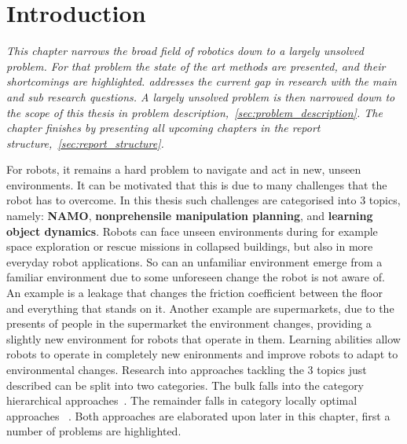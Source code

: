 \chapter{Introduction}%
\label{chap:introduction}
\textit{This chapter narrows the broad field of robotics down to a largely unsolved problem. For that problem the state of the art methods are presented, and their shortcomings are highlighted.  addresses the current gap in research with the main and sub research questions. A largely unsolved problem is then narrowed down to the scope of this thesis in problem description,~\cref{sec:problem_description}. The chapter finishes by presenting all upcoming chapters in the report structure,~\cref{sec:report_structure}.\bs}



For robots, it remains a hard problem to navigate and act in new, unseen environments. It can be motivated that this is due to many challenges that the robot has to overcome. In this thesis such challenges are categorised into 3 topics, namely: \textbf{\ac{NAMO}}, \textbf{nonprehensile manipulation planning}, and \textbf{learning object dynamics}. Robots can face unseen environments during for example space exploration or rescue missions in collapsed buildings, but also in more everyday robot applications. So can an unfamiliar environment emerge from a familiar environment due to some unforeseen change the robot is not aware of. An example is a leakage that changes the friction coefficient between the floor and everything that stands on it. Another example are supermarkets, due to the presents of people in the supermarket the environment changes, providing a slightly new environment for robots that operate in them. Learning abilities allow robots to operate in completely new enironments and improve robots to adapt to environmental changes. Research into approaches tackling the 3 topics just described can be split into two categories. The bulk falls into the category hierarchical approaches~\cite{kaelbling_hierarchical_2011,scholz_navigation_2016,krontiris_dealing_2015}. The remainder falls in category locally optimal approaches ~\cite{vega-brown_asymptotically_2020,sabbaghnovin_optimal_2016,novin_dynamic_2018,sabbaghnovin_model_2021}. Both approaches are elaborated upon later in this chapter, first a number of problems are highlighted.\bs

